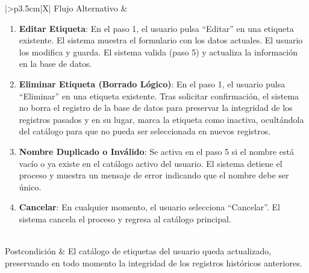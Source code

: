 \begin{xltabular}{\textwidth}{|>{\bfseries}p{3.5cm}|X|}
    Flujo Alternativo & 
    \begin{enumerate}[leftmargin=0.5cm, topsep=0pt, partopsep=0pt, parsep=0pt, itemsep=4pt]
        \item \textbf{Editar Etiqueta}: En el paso 1, el usuario pulsa ``Editar'' en una etiqueta existente. El sistema muestra el formulario con los datos actuales. El usuario los modifica y guarda. El sistema valida (paso 5) y actualiza la información en la base de datos.
        \item \textbf{Eliminar Etiqueta (Borrado Lógico)}: En el paso 1, el usuario pulsa ``Eliminar'' en una etiqueta existente. Tras solicitar confirmación, el sistema no borra el registro de la base de datos para preservar la integridad de los registros pasados y en su lugar, marca la etiqueta como inactiva, ocultándola del catálogo para que no pueda ser seleccionada en nuevos registros.
        \item \textbf{Nombre Duplicado o Inválido}: Se activa en el paso 5 si el nombre está vacío o ya existe en el catálogo activo del usuario. El sistema detiene el proceso y muestra un mensaje de error indicando que el nombre debe ser único.
        \item \textbf{Cancelar}: En cualquier momento, el usuario selecciona ``Cancelar''. El sistema cancela el proceso y regresa al catálogo principal.
    \end{enumerate}
    \\ \hline
    Postcondición & El catálogo de etiquetas del usuario queda actualizado, preservando en todo momento la integridad de los registros históricos anteriores. \\ \hline

    \caption{CU8: Gestionar Etiquetas}
    \label{tab:esp_cu8} \\
\end{xltabular}
\endgroup

